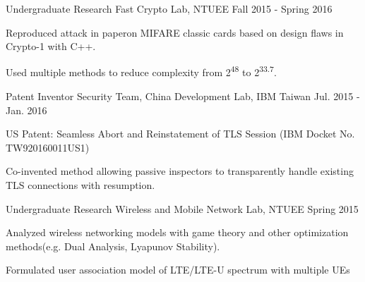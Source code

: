   \begin{cventries}
    \cventry
      {Undergraduate Research}
      {Fast Crypto Lab, NTUEE}
      {Fall 2015 - Spring 2016}
      {}
      {
        \begin{cvitems}
          \item {Reproduced attack in paper\footnotemark[1] on MIFARE classic cards based on design flaws in Crypto-1 with C++.}
          \item {Used multiple methods to reduce complexity from 2\textsuperscript{48} to 2\textsuperscript{33.7}. }
        \end{cvitems}
      }
    \cventry
      {Patent Inventor}
      {Security Team, China Development Lab, IBM Taiwan}
      {Jul. 2015 - Jan. 2016}
      {}
      {
        \begin{cvitems}
          \item {US Patent: Seamless Abort and Reinstatement of TLS Session (IBM Docket No. TW920160011US1)}
          \item {Co-invented method allowing passive inspectors to transparently handle existing TLS connections with resumption.}
        \end{cvitems}
      }
    \cventry
      {Undergraduate Research}
      {Wireless and Mobile Network Lab, NTUEE}
      {Spring 2015}
      {}
      {
        \begin{cvitems}
          \item {Analyzed wireless networking models with game theory and other optimization methods(e.g. Dual Analysis, Lyapunov Stability).}
          \item {Formulated user association model of LTE/LTE-U spectrum with multiple UEs}
        \end{cvitems}
      }
  \end{cventries}
